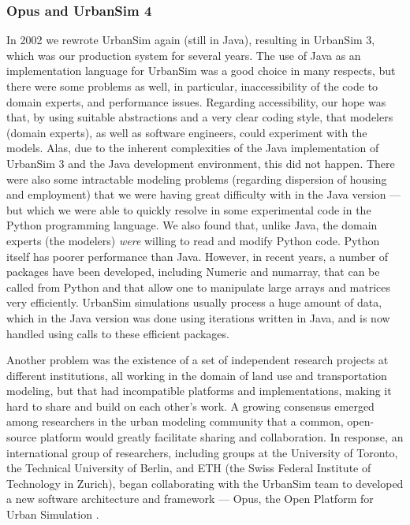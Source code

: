 \subsubsection{Opus and UrbanSim 4}
\label{sec:opus}

In 2002 we rewrote UrbanSim again (still in Java), resulting in
UrbanSim 3, which was our production system for several years.  The
use of Java as an implementation language for UrbanSim was a good
choice in many respects, but there were some problems as well, in
particular, inaccessibility of the code to domain experts, and
performance issues.  Regarding accessibility, our hope was that, by
using suitable abstractions and a very clear coding style, that
modelers (domain experts), as well as software engineers, could
experiment with the models.  Alas, due to the inherent complexities
of the Java implementation of UrbanSim 3 and the Java development
environment, this did not happen. There were also some intractable
modeling problems (regarding dispersion of housing and employment)
that we were having great difficulty with in the Java version
--- but which we were able to quickly resolve in some experimental code in the
Python programming language.  We also found that, unlike Java, the
domain experts (the modelers) \emph{were} willing to read and
modify Python code.  Python itself has poorer performance than
Java.  However, in recent years, a number of packages have been
developed, including Numeric and numarray, that can be called from
Python and that allow one to manipulate large arrays and matrices very
efficiently.  UrbanSim simulations usually process a huge amount of
data, which in the Java version was done using iterations written in
Java, and is now handled using calls to these efficient packages.

Another problem was the existence of a set of independent research
projects at different institutions, all working in the domain of
land use and transportation modeling, but that had incompatible
platforms and implementations, making it hard to share and build on
each other's work.  A growing consensus emerged among researchers in
the urban modeling community that a common, open-source platform
would greatly facilitate sharing and collaboration.  In response, an
international group of researchers, including groups at the
University of Toronto, the Technical University of Berlin, and ETH
(the Swiss Federal Institute of Technology in Zurich), began
collaborating with the UrbanSim team to developed a new software
architecture and framework --- Opus, the Open Platform for Urban
Simulation \cite{waddell-opus-2005}.

